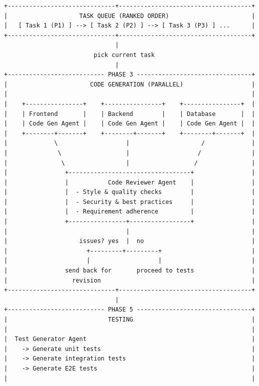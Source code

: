 \documentclass[11pt,a4paper]{article}
\begin{document}
\begin{center}
\begin{lstlisting}
+------------------------------+-------------------------------------+
|                    TASK QUEUE (RANKED ORDER)                       |
|   [ Task 1 (P1) ] --> [ Task 2 (P2) ] --> [ Task 3 (P3) ] ...      |
+------------------------------+-------------------------------------+
                               |
                         pick current task
                               |
+--------------------------- PHASE 3 --------------------------------+
|                       CODE GENERATION (PARALLEL)                   |
|                                                                    |
|    +----------------+    +----------------+    +----------------+  |
|    | Frontend       |    | Backend        |    | Database       |  |
|    | Code Gen Agent |    | Code Gen Agent |    | Code Gen Agent |  |
|    +--------+-------+    +--------+-------+    +--------+-------+  |
|             \                   |                    /             |
|              \                  |                   /              |
|               \                 |                  /               |
|                +----------------------------------+                |
|                |           Code Reviewer Agent    |                |
|                |  - Style & quality checks        |                |
|                |  - Security & best practices     |                |
|                |  - Requirement adherence         |                |
|                +----------------+-----------------+                |
|                                 |                                  |
|                    issues? yes  |  no                              |
|                      +---------+---------+                         |
|                      |                   |                         |
|                send back for       proceed to tests                |
|                  revision                                          |
+------------------------------+-------------------------------------+
                               |
+--------------------------- PHASE 5 --------------------------------+
|                            TESTING                                 |
|                                                                    |
|  Test Generator Agent                                              |
|    -> Generate unit tests                                          |
|    -> Generate integration tests                                   |
|    -> Generate E2E tests                                           |
|                                                                    |

\end{lstlisting}
\end{center}
\end{document}
